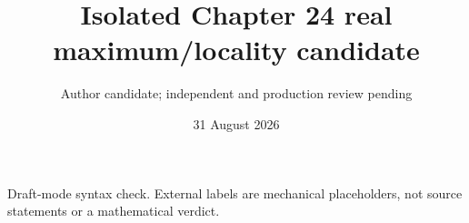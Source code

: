 \documentclass[11pt]{article}
\title{Isolated Chapter 24 real maximum/locality candidate}
\author{Author candidate; independent and production review pending}
\date{31 August 2026}
\begin{document}
\maketitle
\noindent Draft-mode syntax check. External labels are mechanical
placeholders, not source statements or a mathematical verdict.





\end{document}
